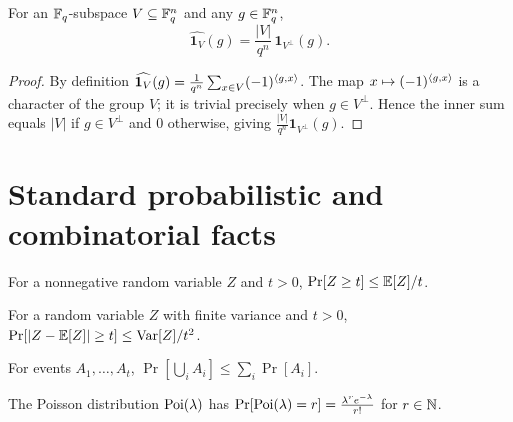\begin{lemma}
  \label{lem:fourier-subspace}
  For an $\mathbb{F}_q$-subspace $V \subseteq \mathbb{F}_q^n$ and any $g \in \mathbb{F}_q^n$,
  \[
    \widehat{\mathbf{1}_V}(g) = \frac{|V|}{q^n}\,\mathbf{1}_{V^\perp}(g).
  \]
\end{lemma}
\begin{proof}
  By definition $\widehat{\mathbf{1}_V}(g) = \frac{1}{q^n}\sum_{x \in V}
  (-1)^{\langle g, x\rangle}$. The map $x \mapsto (-1)^{\langle g, x\rangle}$ is a character of
  the group $V$; it is trivial precisely when $g \in V^\perp$. Hence the inner
  sum equals $|V|$ if $g \in V^\perp$ and $0$ otherwise, giving
  $\frac{|V|}{q^n}\mathbf{1}_{V^\perp}(g)$.
\end{proof}

\section{Standard probabilistic and combinatorial facts}

\begin{lemma}
  \label{lem:markov}
  \mathlibok
  For a nonnegative random variable $Z$ and $t > 0$, $\Pr[Z \geq t] \leq
  \mathbb{E}[Z]/t$.
\end{lemma}

\begin{lemma}
  \label{lem:chebyshev}
  \mathlibok
  For a random variable $Z$ with finite variance and $t > 0$,
  $\Pr[|Z - \mathbb{E}[Z]| \geq t] \leq \operatorname{Var}[Z]/t^2$.
\end{lemma}

\begin{lemma}
  \label{lem:union-bound}
  \mathlibok
  For events $A_1,\dots,A_t$, $\Pr[\bigcup_i A_i] \leq \sum_i \Pr[A_i]$.
\end{lemma}

\begin{lemma}
  \label{lem:poisson-pmf}
  \mathlibok
  The Poisson distribution $\operatorname{Poi}(\lambda)$ has $\Pr[\operatorname{Poi}(\lambda) = r] =
  \frac{\lambda^r e^{-\lambda}}{r!}$ for $r \in \mathbb{N}$.
\end{lemma}

